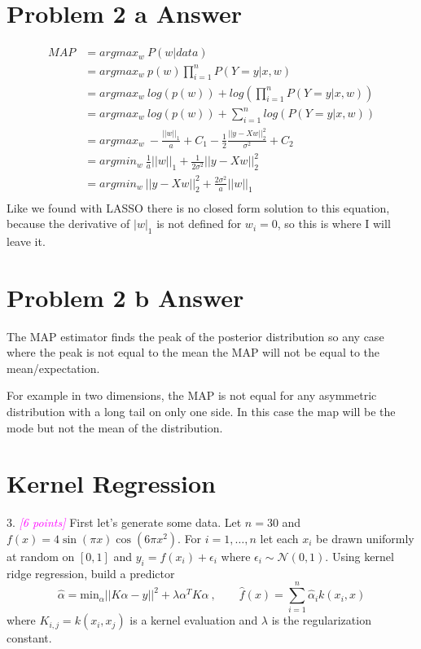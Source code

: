 \documentclass{article}
\newcommand{\1}{\mathbf{1}}
\newcommand{\grade}[1]{\small\textcolor{magenta}{\emph{[#1 points]}} \normalsize}
\begin{document}
\section*{Problem 2 a Answer}

\begin{align}
    MAP & = argmax_w \  P(w | data ) \\
    & = argmax_w \   p(w)  \prod_{i=1}^{n} P(Y=y | x, w)  \\ 
    & = argmax_w \  log( p(w) ) + log(   \prod_{i=1}^{n} P(Y=y | x, w)  )  \\
    & = argmax_w \  log( p(w) ) +   \sum_{i=1}^{n} log( P(Y=y | x, w)  )  \\ 
    & = argmax_w \  - \frac{||w||_1}{ a } + C_1 - \frac{1}{2} \frac{|| y - Xw ||^2_2}{\sigma^2} + C_2    \\ 
    & = argmin_w \    \frac{1}{a} ||w||_1  +  \frac{1}{2\sigma^2} || y - Xw ||^2_2    \\ 
    & = argmin_w \    || y - Xw ||^2_2 + \frac{2\sigma^2}{a} ||w||_1   \\ 
\end{align}
Like we found with LASSO there is no closed form solution to this equation, because the derivative of $|w|_1$ is not defined for $w_i=0$, so this is where I will leave it. 


\section*{Problem 2 b Answer}

The MAP estimator finds the peak of the posterior distribution so any case where the peak is not equal to the mean the MAP will not be equal to the mean/expectation.

For example in two dimensions, the MAP is not equal for any asymmetric distribution with a long tail on only one side. In this case the map will be the mode but not the mean of the distribution. 



\newpage 












\section{Kernel Regression}

3. \grade{6} First let's generate some data. Let $n=30$ and $f(x) = 4 \sin(\pi x)\cos(6\pi x^2)$. For $i=1,\dots,n$ let each $x_i$ be drawn uniformly at random on $[0,1]$ and $y_i = f(x_i) + \epsilon_i$ where $\epsilon_i \sim \mathcal{N}(0,1)$.
Using kernel ridge regression, build a predictor
\[
  \widehat{\alpha} = \mbox{min}_\alpha ||K\alpha - y||^2 + \lambda \alpha^T K \alpha \ , \quad \quad \widehat{f}(x)=\sum_{i=1}^n \widehat{\alpha}_i k(x_i,x) 
\]
where $K_{i,j} = k(x_i,x_j)$ is a kernel evaluation and $\lambda$ is the regularization constant. 
\end{document}
